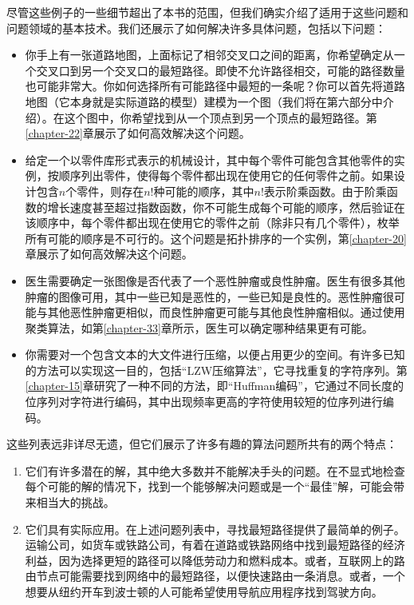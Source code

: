 \documentclass[lang=cn,newtx,10pt,scheme=chinese]{elegantbook}
\begin{document}
尽管这些例子的一些细节超出了本书的范围，但我们确实介绍了适用于这些问题和问题领域的基本技术。我们还展示了如何解决许多具体问题，包括以下问题：

\begin{itemize}
    \item 你手上有一张道路地图，上面标记了相邻交叉口之间的距离，你希望确定从一个交叉口到另一个交叉口的最短路径。即使不允许路径相交，可能的路径数量也可能非常大。你如何选择所有可能路径中最短的一条呢？你可以首先将道路地图（它本身就是实际道路的模型）建模为一个图（我们将在第六部分中介绍）。在这个图中，你希望找到从一个顶点到另一个顶点的最短路径。第\ref{chapter-22}章展示了如何高效解决这个问题。
    \item 给定一个以零件库形式表示的机械设计，其中每个零件可能包含其他零件的实例，按顺序列出零件，使得每个零件都出现在使用它的任何零件之前。如果设计包含$n$个零件，则存在$n!$种可能的顺序，其中$n!$表示阶乘函数。由于阶乘函数的增长速度甚至超过指数函数，你不可能生成每个可能的顺序，然后验证在该顺序中，每个零件都出现在使用它的零件之前（除非只有几个零件），枚举所有可能的顺序是不可行的。这个问题是拓扑排序的一个实例，第\ref{chapter-20}章展示了如何高效解决这个问题。
    \item 医生需要确定一张图像是否代表了一个恶性肿瘤或良性肿瘤。医生有很多其他肿瘤的图像可用，其中一些已知是恶性的，一些已知是良性的。恶性肿瘤很可能与其他恶性肿瘤更相似，而良性肿瘤更可能与其他良性肿瘤相似。通过使用聚类算法，如第\ref{chapter-33}章所示，医生可以确定哪种结果更有可能。
    \item 你需要对一个包含文本的大文件进行压缩，以便占用更少的空间。有许多已知的方法可以实现这一目的，包括``LZW压缩算法''，它寻找重复的字符序列。第\ref{chapter-15}章研究了一种不同的方法，即``Huffman编码''，它通过不同长度的位序列对字符进行编码，其中出现频率更高的字符使用较短的位序列进行编码。
\end{itemize}

这些列表远非详尽无遗，但它们展示了许多有趣的算法问题所共有的两个特点：

\begin{enumerate}
    \item 它们有许多潜在的解，其中绝大多数并不能解决手头的问题。在不显式地检查每个可能的解的情况下，找到一个能够解决问题或是一个``最佳''解，可能会带来相当大的挑战。
    \item 它们具有实际应用。在上述问题列表中，寻找最短路径提供了最简单的例子。运输公司，如货车或铁路公司，有着在道路或铁路网络中找到最短路径的经济利益，因为选择更短的路径可以降低劳动力和燃料成本。或者，互联网上的路由节点可能需要找到网络中的最短路径，以便快速路由一条消息。或者，一个想要从纽约开车到波士顿的人可能希望使用导航应用程序找到驾驶方向。
\end{enumerate}
\end{document}
